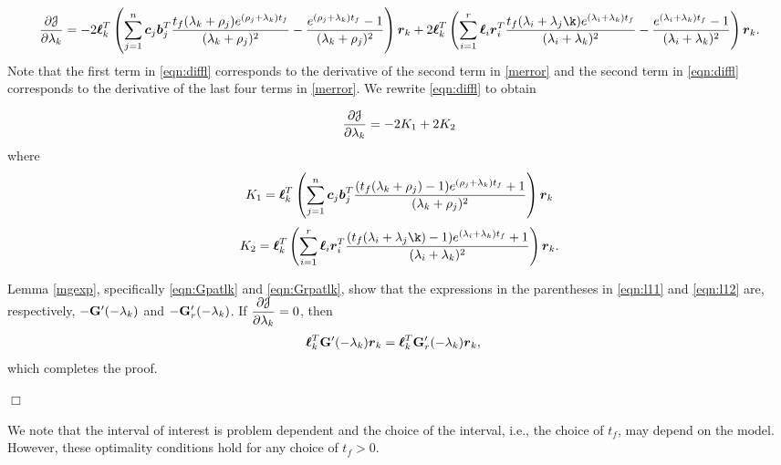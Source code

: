 \documentclass[twocolumn]{autart}
\begin{document}
\begin{dmath}\label{eqn:diffl}
\pder[\J]{\lambda_k}=-2\lc_k^T \left(\sum_{j=1}^n \cc_j\bb_j^T \dfrac{{\tf}(\lambda_k+\rho_j)e^{(\rho_j+\lambda_k){\tf}}} {(\lambda_k+\rho_j)^2}     -\dfrac       {e^{(\rho_j+\lambda_k){\tf}}-1}{(\lambda_k+\rho_j)^2}\right)\rc_k 
+2\lc_k^T \left(\sum^r_{i=1} \lc_i\rc_i^T\dfrac{{\tf}(\lambda_i+\lambda_j\k)e^{(\lambda_i+\lambda_k){\tf}}}  {(\lambda_i+\lambda_k)^2}         -\dfrac{e^{(\lambda_i+\lambda_k){\tf}}-1}{(\lambda_i+\lambda_k)^2}\right)\rc_k.
\end{dmath}
Note that the first term in \eqref{eqn:diffl} corresponds to the derivative of the second term in \eqref{merror} and the second term in \eqref{eqn:diffl} corresponds to the derivative of the last four terms in \eqref{merror}.
We rewrite \eqref{eqn:diffl} to obtain 

\begin{dmath}
\pder[\J]{\lambda_k} =-2K_1+2K_2
\end{dmath}
where
\begin{dmath}\label{eqn:l11} 
K_1=\lc_k^T \left(\sum_{j=1}^n \cc_j\bb_j^T \dfrac{({\tf}(\lambda_k+\rho_j)-1)e^{(\rho_j+\lambda_k){\tf}}+1}{(\lambda_k+\rho_j)^2}\right)\rc_k  
\end{dmath}
\begin{dmath}\label{eqn:l12} 
K_2=\lc_k^T \left(\sum^r_{i=1} \lc_i\rc_i^T\dfrac{({\tf}(\lambda_i+\lambda_j\k)-1)e^{(\lambda_i+\lambda_k){\tf}}+1}{(\lambda_i+\lambda_k)^2}\right)\rc_k.
\end{dmath}

Lemma \eqref{mgexp}, specifically \eqref{eqn:Gpatlk} and \eqref{eqn:Grpatlk}, show that the expressions in the parentheses in \eqref{eqn:l11}  and \eqref{eqn:l12}   are, respectively, $-\G'(-\lambda_k)$ and $-\G_r'(-\lambda_k)$.
If $\pder[\J]{\lambda_k}= 0$, then
\begin{align*}
\lc_k^T\G'(-\lambda_k)\rc_k&=\lc_k^T\G_r'(-\lambda_k)\rc_k,
\end{align*}
which completes the proof.
\begin{flushright} $\Box$  \end{flushright}
We note that the interval of interest is problem dependent and the choice of the interval, i.e., the choice of $t_f$, may depend on the model. However, these optimality conditions hold for any choice of $t_f>0$.
\end{document}
